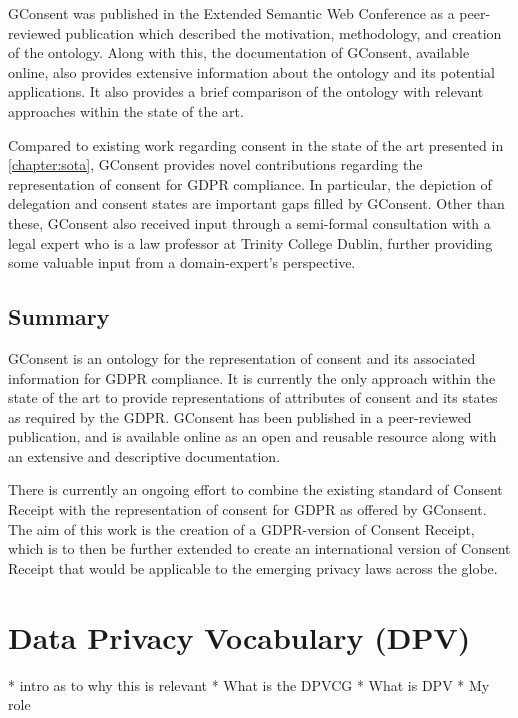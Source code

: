GConsent was published in the Extended Semantic Web Conference as a peer-reviewed publication \cite{} which described the motivation, methodology, and creation of the ontology. Along with this, the documentation of GConsent, available online, also provides extensive information about the ontology and its potential applications. It also provides a brief comparison of the ontology with relevant approaches within the state of the art.

Compared to existing work regarding consent in the state of the art presented in \autoref{chapter:sota}, GConsent provides novel contributions regarding the representation of consent for GDPR compliance.
In particular, the depiction of delegation and consent states are important gaps filled by GConsent.
Other than these, GConsent also received input through a semi-formal consultation with a legal expert who is a law professor at Trinity College Dublin, further providing some valuable input from a domain-expert's perspective.

\subsection*{Summary}
GConsent is an ontology for the representation of consent and its associated information for GDPR compliance.
It is currently the only approach within the state of the art to provide representations of attributes of consent and its states as required by the GDPR.
GConsent has been published in a peer-reviewed publication, and is available online as an open and reusable resource along with an extensive and descriptive documentation.

There is currently an ongoing effort to combine the existing standard of Consent Receipt \cite{} with the representation of consent for GDPR as offered by GConsent. The aim of this work is the creation of a GDPR-version of Consent Receipt, which is to then be further extended to create an international version of Consent Receipt that would be applicable to the emerging privacy laws across the globe. 

\section{Data Privacy Vocabulary (DPV)}\label{sec:voc:DPV}

* intro as to why this is relevant
* What is the DPVCG
* What is DPV
* My role

